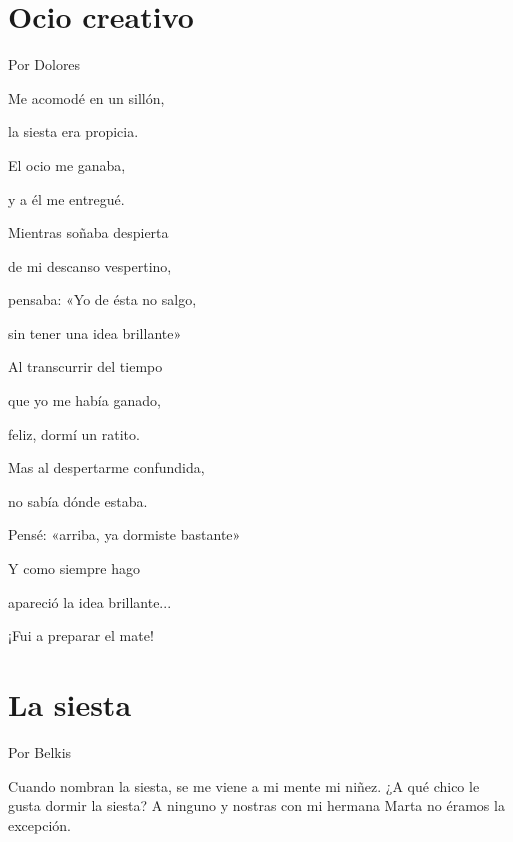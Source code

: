\documentclass[11pt,twoside,openright,a5paper]{book}
\begin{document}
\section*{Ocio creativo}

\begin{flushright}Por Dolores\end{flushright}

\begin{center}
Me acomodé en un sillón,

la siesta era propicia.

El ocio me ganaba,

y a él me entregué.

\vspace{0.5cm}

Mientras soñaba despierta

de mi descanso vespertino,

pensaba: «Yo de ésta no salgo,

sin tener una idea brillante»

\vspace{0.5cm}

Al transcurrir del tiempo

que yo me había ganado,

feliz, dormí un ratito.

\vspace{0.5cm}

Mas al despertarme confundida,

no sabía dónde estaba.

Pensé: «arriba, ya dormiste bastante»

Y como siempre hago

apareció la idea brillante...

¡Fui a preparar el mate!
\end{center}

\section*{La siesta}
                                                                                                             \begin{flushright}Por Belkis\end{flushright}

Cuando nombran la siesta, se me viene a mi mente mi niñez. ¿A qué chico le gusta dormir la siesta? A ninguno y nostras con mi hermana Marta no éramos la excepción.
\end{document}
